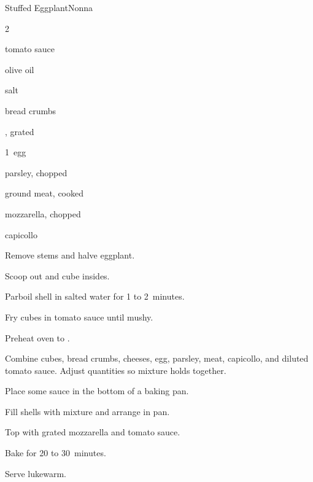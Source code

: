 \begin{recipe}{Stuffed Eggplant}{Nonna}{}

\begin{ingredients}
\item 2~
\item tomato sauce
\item olive oil
\item salt
\item bread crumbs
\item {}, grated
\item 1~egg
\item parsley, chopped
\item ground meat, cooked
\item mozzarella, chopped
\item capicollo
\end{ingredients}

\begin{directions}
\item Remove stems and halve eggplant.
\item Scoop out and cube insides.
\item Parboil shell in salted water for 1 to 2~minutes.
\item Fry cubes in tomato sauce until mushy.
\item Preheat oven to .
\item Combine cubes, bread crumbs, cheeses, egg, parsley, meat, capicollo, and diluted tomato sauce. Adjust quantities so mixture holds together.
\item Place some sauce in the bottom of a baking pan.
\item Fill shells with mixture and arrange in pan.
\item Top with grated mozzarella and tomato sauce.
\item Bake for 20 to 30~minutes.
\item Serve lukewarm.
\end{directions}

\end{recipe}
